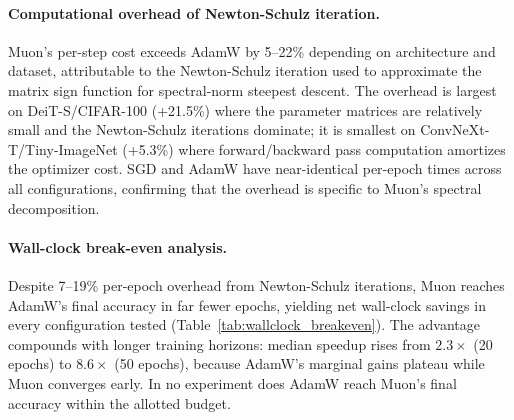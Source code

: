 \paragraph{Computational overhead of Newton-Schulz iteration.}
Muon's per-step cost exceeds AdamW by 5--22\% depending on architecture and dataset, attributable to the Newton-Schulz iteration used to approximate the matrix sign function for spectral-norm steepest descent. The overhead is largest on DeiT-S/CIFAR-100 (+21.5\%) where the parameter matrices are relatively small and the Newton-Schulz iterations dominate; it is smallest on ConvNeXt-T/Tiny-ImageNet (+5.3\%) where forward/backward pass computation amortizes the optimizer cost. SGD and AdamW have near-identical per-epoch times across all configurations, confirming that the overhead is specific to Muon's spectral decomposition.

\paragraph{Wall-clock break-even analysis.}
Despite 7--19\% per-epoch overhead from Newton-Schulz iterations, Muon reaches AdamW's final accuracy in far fewer epochs, yielding net wall-clock savings in every configuration tested (Table~\ref{tab:wallclock_breakeven}).
The advantage compounds with longer training horizons: median speedup rises from $2.3\times$ (20 epochs) to $8.6\times$ (50 epochs), because AdamW's marginal gains plateau while Muon converges early.
In no experiment does AdamW reach Muon's final accuracy within the allotted budget.


